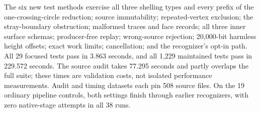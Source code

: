 The six new test methods exercise all three shelling types and every prefix
of the one-crossing-circle reduction; source immutability; repeated-vertex
exclusion; the stray-boundary obstruction; malformed traces and face records;
all three inner surface schemas; producer-free replay; wrong-source rejection;
20,000-bit harmless height offsets; exact work limits; cancellation; and the
recognizer's opt-in path. All 29 focused tests pass in 3.863 seconds, and all
1,229 maintained tests pass in 229.572 seconds. The source audit takes 77.295
seconds and partly overlaps the full suite; these times are validation costs,
not isolated performance measurements. Audit and timing datasets each pin
508 source files. On the 19 ordinary pipeline controls, both settings finish
through earlier recognizers, with zero native-stage attempts in all 38 runs.


